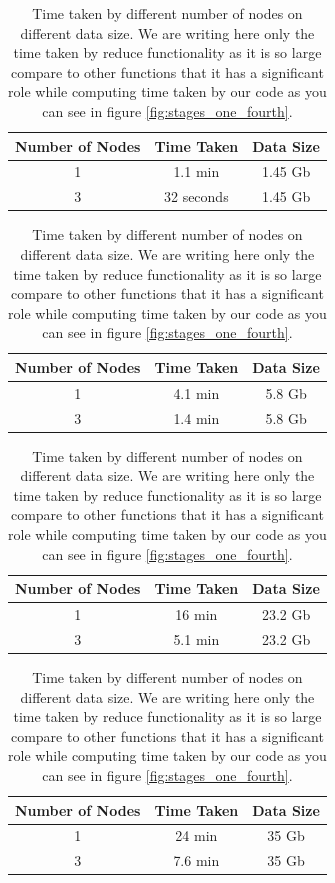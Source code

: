 \begin{table}[]
    \centering
    \begin{tabular}{|c|c|c|}
\hline
Number of Nodes  & Time Taken & Data Size \\ \hline
        1 & 1.1 min & 1.45 Gb \\ \hline
        3 & 32 seconds & 1.45 Gb \\
\hline
\end{tabular}
\quad
\begin{tabular}{|c|c|c|}
\hline
Number of Nodes  & Time Taken & Data Size \\ \hline
        1 & 4.1 min & 5.8 Gb \\ \hline
        3 & 1.4 min & 5.8 Gb \\
\hline
\end{tabular}
\begin{tabular}{|c|c|c|}
\hline
Number of Nodes  & Time Taken & Data Size \\ \hline
        1 & 16 min & 23.2 Gb \\ \hline
        3 & 5.1 min & 23.2 Gb \\
\hline
\end{tabular}
\quad
\begin{tabular}{|c|c|c|}
\hline
Number of Nodes  & Time Taken & Data Size \\ \hline
        1 & 24 min & 35 Gb \\ \hline
        3 & 7.6 min & 35 Gb \\
\hline
\end{tabular}
    \caption{Time taken by different number of nodes on different data size. We are writing here only the time taken by reduce functionality as it is so large compare to other functions that it has a significant role while computing time taken by our code as you can see in figure \ref{fig:stages_one_fourth}.}
    \label{table_time}
\end{table}





